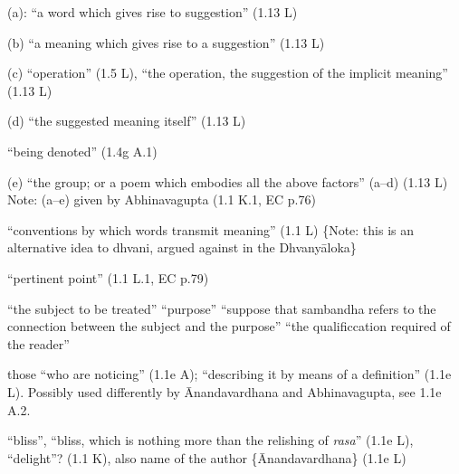 \documentclass[10pt]{article}
\begin{document}
\begin{multicols}{2}
\begin{enumerate}[
			leftmargin=0em,
			rightmargin=0em,
		]
		 (a): ``a word which gives rise to suggestion'' (1.13 L)

		 (b) ``a meaning which gives rise to a suggestion'' (1.13 L)

		 (c) ``operation'' (1.5 L),
		``the operation, the suggestion of the implicit meaning'' (1.13 L)

		 (d) ``the suggested meaning itself'' (1.13 L)

		 ``being denoted'' (1.4g A.1)

		 (e) ``the group; or a poem which embodies all the above factors'' (a--d) (1.13 L) Note: (a--e) given by Abhinavagupta (1.1 K.1, EC p.76)

		  ``conventions by which words transmit meaning'' (1.1 L) \{Note: this is an alternative idea to dhvani, argued against in the Dhvanyāloka\}

		 ``pertinent point'' (1.1 L.1, EC p.79)
		\begin{enumerate}
			 ``the subject to be treated''
			 ``purpose''
			 ``suppose that sambandha refers to the connection between the subject and the purpose''
			 ``the qualificcation required of the reader''
		\end{enumerate}

		 those ``who are noticing'' (1.1e A); ``describing it by means of a definition'' (1.1e L). Possibly used differently by Ānandavardhana and Abhinavagupta, see 1.1e A.2.

		 ``bliss'', ``bliss, which is nothing more than the relishing of \textit{rasa}'' (1.1e L), ``delight''? (1.1 K), also name of the author \{Ānandavardhana\} (1.1e L)


\end{enumerate}
\end{multicols}
\end{document}
